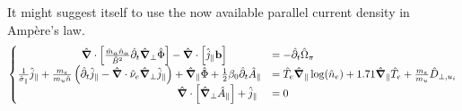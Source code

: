 

It might suggest itself to use the now available parallel current density in Ampère's law. 
\begin{equation}
\label{eq:vorticityEquation_ElectronInertiaElectromagnetism_dedimensionalized_matrix}
\begin{cases}
\qquad\qquad\qquad\hat{\grad}\cdot\left[\frac{\hat{m}_\alpha \hat{n}_\alpha}{ \hat{B}^2}\hat{\partial}_t\hat{\grad}_\perp\hat{\Phi}\right] - \hat{\grad}\cdot\left[\hat{j}_\parallel \mathbf{b}\right]
&= -\hat{\partial}_t \hat{\Omega}_\pi \\
\frac{1}{\hat{\sigma}_\parallel}\hat{j}_\parallel + \frac{m_e}{m_u\hat{n}} \left(\hat{\partial}_t\hat{j}_\parallel - \hat{\grad}\cdot\hat{\nu}_e\hat{\grad}_\perp\hat{j}_\parallel\right)+ \hat{\grad}_\parallel\hat{\Phi} + \frac{1}{2}\beta_0\hat{\partial}_t\hat{A}_\parallel &= \hat{T}_e\hat{\grad}_\parallel\log(\hat{n}_e) + 1.71\hat{\grad}_\parallel \hat{T}_e + \frac{m_e}{m_u}\hat{D}_{\perp,u_i} \\
\qquad\qquad\qquad\qquad\qquad\qquad\qquad\quad\hat{\grad}\cdot\left[\hat{\grad}_\perp \hat{A}_\parallel\right] + \hat{j}_\parallel
&= 0
\end{cases}
\end{equation}

